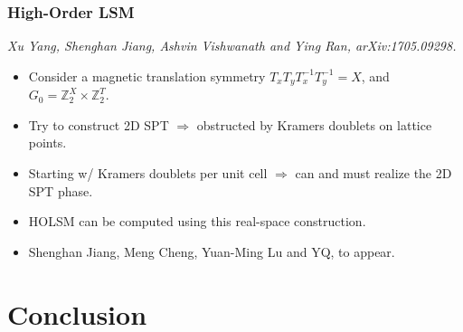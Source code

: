\documentclass[xcolor=table, 10pt, aspectratio=43]{beamer}
\begin{document}
\begin{frame}
	\frametitle{High-Order LSM}

	\emph{\small Xu Yang, Shenghan Jiang, Ashvin Vishwanath and Ying Ran, arXiv:1705.09298.}
	\begin{itemize}
		\item Consider a magnetic translation symmetry $T_xT_yT_x^{-1}T_y^{-1} = X$, and $G_0=\mathbb Z_2^X\times\mathbb Z_2^T$.
		\item Try to construct 2D SPT $\Rightarrow$ obstructed by Kramers doublets on lattice points.
		\item Starting w/ Kramers doublets per unit cell $\Rightarrow$ can and must realize the 2D SPT phase.
		\item HOLSM can be computed using this real-space construction.
		\item Shenghan Jiang, Meng Cheng, Yuan-Ming Lu and YQ, to appear.
	\end{itemize}
	\begin{center}
	\end{center}
\end{frame}

\section{Conclusion}
\end{document}
